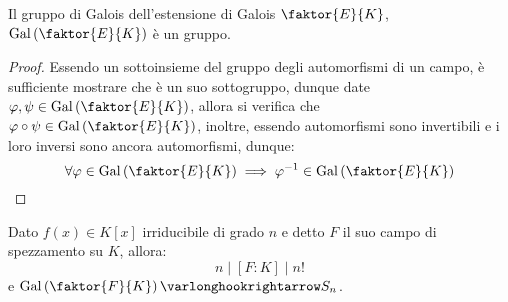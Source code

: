 \documentclass[11pt]{scrartcl}
\begin{document}
\begin{proposition}
    Il gruppo di Galois dell'estensione di Galois $\faktor{E}{K}$, $\Gal\left(\faktor{E}{K}\right)$ è un gruppo.
\end{proposition}

\begin{proof}
    Essendo un sottoinsieme del gruppo degli automorfismi di un campo, è sufficiente mostrare che è un suo sottogruppo, dunque date $\varphi,\psi \in \Gal\left(\faktor{E}{K}\right)$, allora 
    si verifica che $\varphi \circ \psi \in \Gal\left(\faktor{E}{K}\right)$, inoltre, essendo automorfismi sono invertibili e i loro inversi sono ancora automorfismi, dunque:
    \[ \forall \varphi \in \Gal\left(\faktor{E}{K}\right) \implies \varphi^{-1} \in \Gal\left(\faktor{E}{K}\right)
        \]
\end{proof}
   
\begin{proposition}
    \label{3.55}
    Dato $f(x) \in K[x]$ irriducibile di grado $n$ e detto $F$ il suo campo di spezzamento su $K$, allora:
    \[ n \mid [F : K] \mid n!
        \]
    e $\Gal\left(\faktor{F}{K}\right) \varlonghookrightarrow S_n$. 
\end{proposition}
\end{document}
